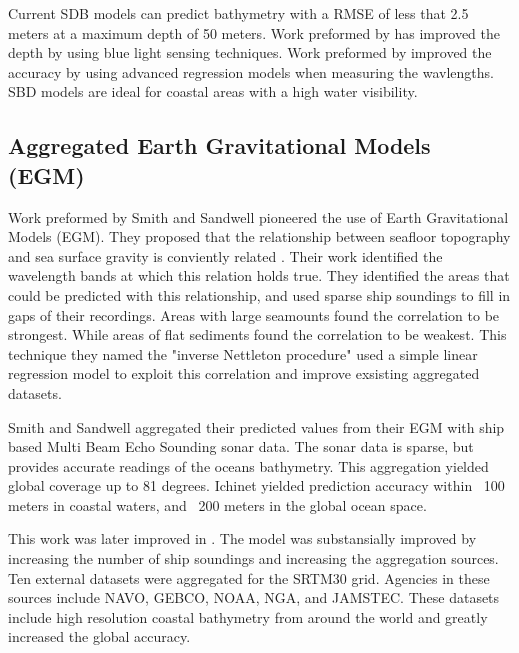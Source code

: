 \par
Current \ac{SDB} models can predict bathymetry with a \ac{RMSE} of less that 2.5 meters at a maximum depth of 50 meters.
Work preformed by \cite{vinayaraj2016satellite} has improved the depth by using blue light sensing techniques.
Work preformed by \cite{chybicki2018three} improved the accuracy by using advanced regression models when measuring the wavlengths.
\ac{SBD} models are ideal for coastal areas with a high water visibility.

\subsection{Aggregated Earth Gravitational Models (EGM)}
Work preformed by Smith and Sandwell \cite{smith1994bathymetric}\cite{smith1997global} pioneered the use of Earth Gravitational Models (EGM).
They proposed that the relationship between seafloor topography and sea surface gravity is conviently related \cite{smith1994bathymetric}.
Their work identified the wavelength bands at which this relation holds true.
They identified the areas that could be predicted with this relationship, and used sparse ship soundings to fill in gaps of their recordings.
Areas with large seamounts found the correlation to be strongest.
While areas of flat sediments found the correlation to be weakest.
This technique they named the "inverse Nettleton procedure" used a simple linear regression model to exploit this correlation and improve exsisting aggregated datasets.

\par
Smith and Sandwell aggregated their predicted values from their \ac{EGM} with ship based Multi Beam Echo Sounding sonar data.
The sonar data is sparse, but provides accurate readings of the oceans bathymetry.
This aggregation yielded global coverage up to 81 degrees.
Ichinet yielded prediction accuracy within ~100 meters in coastal waters, and ~200 meters in the global ocean space.

\par 
This work was later improved in \cite{becker2009global}.
The model was substansially improved by increasing the number of ship soundings and increasing the aggregation sources.
Ten external datasets were aggregated for the SRTM30 grid.
Agencies in these sources include \ac{NAVO}, \ac{GEBCO}, \ac{NOAA}, \ac{NGA}, and \ac{JAMSTEC}.
These datasets include high resolution coastal bathymetry from around the world and greatly increased the global accuracy.


